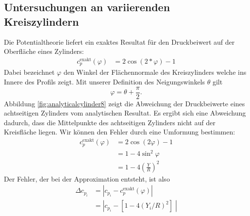 \subsection{Untersuchungen an variierenden Kreiszylindern}
Die Potentialtheorie liefert ein exaktes Resultat für den Druckbeiwert auf der Oberfläche eines Zylinders:
\begin{align}
c_p^\mathrm{exakt} (\varphi ) &=  2 \cos{(2*\varphi )} -1
\end{align}
Dabei bezeichnet $\varphi$ den Winkel der Flächennormale des Kreiszylinders welche ins Innere des Profils zeigt. Mit unserer Definition des Neigungswinkels $\theta$ gilt
\begin{equation}
\varphi = \theta +  \frac{\pi }{2}.
\end{equation}
Abbildung \ref{fig:analyticalcylinder8} zeigt die Abweichung der Druckbeiwerte eines achtseitigen Zylinders vom analytischen Resultat. Es ergibt sich eine Abweichung dadurch, dass die Mittelpunkte des achtseitigen Zylinders nicht auf der Kreisfläche liegen. Wir können den Fehler durch eine Umformung bestimmen:
\begin{align}
c_p^\mathrm{exakt} (\varphi ) &=  2 \cos{(2\varphi )} -1 \\
&= 1 - 4 \sin^2 \varphi \\
&= 1 - 4 \left( \frac{Y}{R}\right)^2
\end{align}
Der Fehler, der bei der Approximation entsteht, ist also
\begin{align}
\Delta c_{p_{i}} &= |c_{p_{i}} - c_p^\mathrm{exakt} (\varphi )| \\
&= |c_{p_{i}} -[ 1 - 4 (Y_{i}/R)^2 ] \;|
\end{align}

